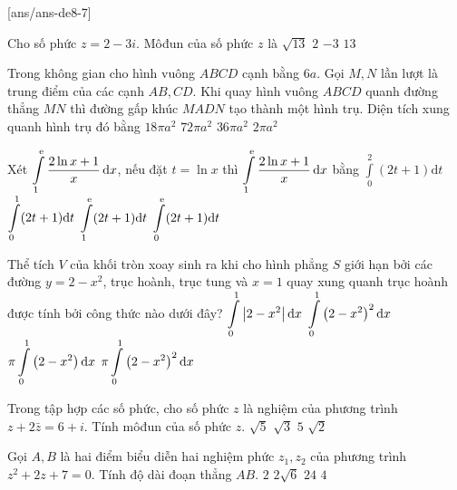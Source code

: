 
\begin{name}
	{\tenchude}
	{\tendethi}
	{\tentruong}
	{\thoigian}
\end{name}
[ans/ans-de8-7]

\begin{ex}%
Cho số phức $z=2-3 i$. Môđun của số phức $z$ là
\choice
{\True $\sqrt{13}$}
{$2$}
{$-3$}
{$13$}

\end{ex}
\begin{ex}%
Trong không gian cho hình vuông $ABCD$ cạnh bằng $6 a$. Gọi $M, N$ lần lượt là trung điểm của các cạnh $AB, CD$. Khi quay hình vuông $ABCD$ quanh đường thẳng $MN$ thì đường gấp khúc $MADN$ tạo thành một hình trụ. Diện tích xung quanh hình trụ đó bằng
\choice
{$18\pi a^2$}
{$72\pi a^2$}
{\True $36\pi a^2$}
{$2\pi a^2$}

\end{ex}
\begin{ex}%
Xét $\displaystyle\int\limits_1^{{\rm e}} \dfrac{2\ln x+1}{x} \mathrm{\,d} x$, nếu đặt $t=\ln x$ thì $\displaystyle\displaystyle\int\limits_1^{{\rm e}} \dfrac{2\ln x+1}{x} \mathrm{\,d} x$ bằng
\choice
{$\displaystyle\int\limits_0^2(2 t+1) \mathrm{d} t$} 
{\True $\displaystyle\displaystyle\int\limits_0^1(2t+1){\rm d}t$}
{$\displaystyle\displaystyle\int\limits_1^{{\rm e}}(2 t+1) \mathrm{d} t$}
{$\displaystyle\displaystyle\int\limits_0^{{\rm e}}(2 t+1) \mathrm{d} t$}
\end{ex}
\begin{ex} %
Thể tích $V$ của khối tròn xoay sinh ra khi cho hình phẳng $S$ giới hạn bởi các đường $y=2-x^2$, trục hoành, trục tung và $x=1$ quay xung quanh trục hoành được tính bởi công thức nào dưới đây?
\choice
{$\displaystyle\int\limits_0^1 \left|2-x^2\right|{\rm d}x$}
{$\displaystyle\int\limits_0^1 \left(2-x^2\right)^2{\rm d}x$}
{$\pi \displaystyle\int\limits_0^1 \left(2-x^2\right){\rm d}x$}
{\True $\pi \displaystyle\int\limits_0^1 \left(2-x^2\right)^2{\rm d}x$}
\end{ex}
\begin{ex}%
Trong tập hợp các số phức, cho số phức $z$ là nghiệm của phương trình $z+2\bar{z}=6+i$. Tính môđun của số phức $z$.
\choice
{\True $\sqrt{5}$}
{$\sqrt{3}$}
{$5$}
{$\sqrt{2}$}

\end{ex}
\begin{ex}%
Gọi $A, B$ là hai điểm biểu diễn hai nghiệm phức $z_1, z_2$ của phương trình $z^2+2 z+7=0$. Tính độ dài đoạn thẳng $AB$.
\choice
{$2$}
{\True $2\sqrt{6}$}
{$24$}
{$4$}

\end{ex}
